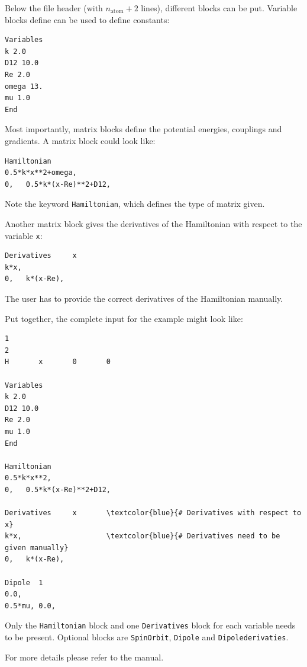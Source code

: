 \documentclass[a4paper,11pt,DIV=15,openany]{scrbook}
\newcommand{\ttt}[1]{\texttt{#1}}
\begin{document}
Below the file header (with $n_\text{atom}+2$ lines), different blocks can be put. Variable blocks define can be used to define constants:
\begin{oframed}
\footnotesize\begin{Verbatim}[commandchars=\\\{\}]
Variables
k 2.0
D12 10.0
Re 2.0
omega 13.
mu 1.0
End
\end{Verbatim}
\end{oframed}

Most importantly, matrix blocks define the potential energies, couplings and gradients. A matrix block could look like:
\begin{oframed}
\footnotesize\begin{Verbatim}[commandchars=\\\{\}]
Hamiltonian
0.5*k*x**2+omega,
0,   0.5*k*(x-Re)**2+D12,
\end{Verbatim}
\end{oframed}
Note the keyword \ttt{Hamiltonian}, which defines the type of matrix given.

Another matrix block gives the derivatives of the Hamiltonian with respect to the variable \ttt{x}:
\begin{oframed}
\footnotesize\begin{Verbatim}[commandchars=\\\{\}]
Derivatives     x
k*x,
0,   k*(x-Re),
\end{Verbatim}
\end{oframed}
The user has to provide the correct derivatives of the Hamiltonian manually.

Put together, the complete input for the example might look like:
\begin{oframed}
\footnotesize\begin{Verbatim}[commandchars=\\\{\}]
1
2
H       x       0       0

Variables
k 2.0
D12 10.0
Re 2.0
mu 1.0
End

Hamiltonian
0.5*k*x**2,
0,   0.5*k*(x-Re)**2+D12,

Derivatives     x       \textcolor{blue}{# Derivatives with respect to x}
k*x,                    \textcolor{blue}{# Derivatives need to be given manually}
0,   k*(x-Re),

Dipole  1
0.0,
0.5*mu, 0.0,

\end{Verbatim}
\end{oframed}

Only the \ttt{Hamiltonian} block and one \ttt{Derivatives} block for each variable needs to be present. Optional blocks are \ttt{SpinOrbit}, \ttt{Dipole} and \ttt{Dipolederivaties}. 

For more details please refer to the manual.
\end{document}
